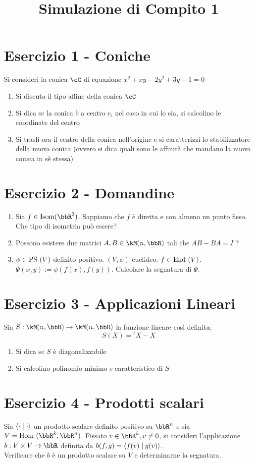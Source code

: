 \documentclass[a4paper,NoNotes,GeneralMath]{stdmdoc}
\begin{document}
	\title{Simulazione di Compito 1}

	\section*{Esercizio 1 - Coniche}
	Si consideri la conica $\cC$ di equazione $x^2+xy-2y^2+3y-1=0$
	\begin{enumerate}
		\item Si discuta il tipo affine della conica $\cC$
		\item Si dica se la conica è a centro e, nel caso in cui lo sia, si calcolino le coordinate del centro
		\item Si trasli ora il centro della conica nell'origine e si caratterizzi lo stabilizzatore della nuova conica (ovvero si dica quali sono le affinità che mandano la nuova conica in sè stessa)
	\end{enumerate}

	\section*{Esercizio 2 - Domandine}
	\begin{enumerate}
		\item Sia $f \in\Isom(\bbR^3)$. Sappiamo che $f$ è diretta e con almeno un punto fisso. Che tipo di isometria può essere?
		\item Possono esistere due matrici $A, B \in \kM(n,\bbR)$ tali che $AB - BA = I$ ?
		\item $\phi \in \mbox{PS }(V)$ definito positivo. $(V, \phi)$ euclideo. $f \in \mbox{End }(V)$. $\Psi(x,y) := \phi(f(x), f(y))$. Calcolare la segnatura di $\Psi$.
	\end{enumerate}

	\section*{Esercizio 3 - Applicazioni Lineari}
		Sia $S: \kM(n, \bbR) \rar \kM(n, \bbR)$ la funzione lineare così definita:
		$$ S(X) = {}^tX - X $$
	\begin{enumerate}
		\item Si dica se $S$ è diagonalizzabile
		\item Si calcolino polinomio minimo e caratteristico di $S$
	\end{enumerate}

	\section*{Esercizio 4 - Prodotti scalari}
		Sia $\langle \cdot \mid \cdot \rangle$ un prodotto scalare definito positivo su $\bbR^n$ e sia $V = \text{Hom }(\bbR^k, \bbR^n)$. Fissato $v \in \bbR^k, v \neq 0$, si consideri l'applicazione $b:V\times V \rar \bbR$ definita da $b(f,g) = \langle f(v) \mid g(v) \rangle$. \\
	Verificare che $b$ è un prodotto scalare su $V$ e determinarne la segnatura.
	
\end{document}
